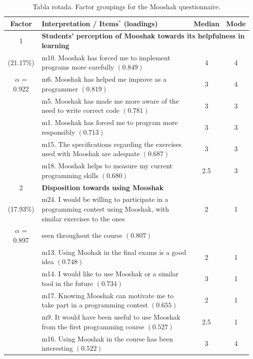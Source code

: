\documentclass[12pt,twoside,titlepage]{report}
\begin{document}
\begin{table}
  \centering
  \caption{Tabla rotada. Factor groupings for the Mooshak questionnaire.}\label{tab:factor_analysis}

\renewcommand{\arraystretch}{1.1}
\begin{scriptsize}
 \begin{tabular}{clcc}
   \hline
   Factor & \textbf{Interpretation} / Items$^{*}$ (loadings)  & Median & Mode \\
   \hline
   \hline
    1 & \multicolumn{3}{l}{\textbf{Students' perception of Mooshak towards its helpfulness in learning} } \\
   \hline
    (21.17\%) & m10. Mooshak has forced me to implement programs more carefully $(0.849)$ & 4 & 4 \\
    $\alpha$ = 0.922 & m6.  Mooshak has helped me improve as a programmer $(0.819)$ & 3 & 4 \\
     & m5.  Mooshak has made me more aware of the need to write correct code $(0.781)$ & 3 & 3\\
     & m1. Mooshak has forced me to program more responsibly $(0.713)$ & 3 & 3 \\
     & m15. The specifications regarding the exercises used with Mooshak are adequate $(0.687)$ & 3 & 3 \\
     & m18. Mooshak helps to measure my current programming skills $(0.680)$ & 2.5 & 3 \\
   \hline
    2 & \multicolumn{3}{l}{\textbf{Disposition towards using Mooshak} } \\
   \hline
    (17.93\%) & m24. I would be willing to participate in a programming contest using Mooshak, with similar exercises to the ones & 2 & 1 \\
    $\alpha$ = 0.897 & seen throughout the course $(0.807)$ & & \\
    & m13. Using Moohak in the final exams is a good idea $(0.748)$ & 2 & 1 \\
    & m14. I would like to use Mooshak or a similar tool in the future $(0.734)$ & 3 & 1 \\
    & m17. Knowing Mooshak can motivate me to take part in a programming contest $(0.655)$ & 2 & 1\\
    & m9. It would have been useful to use Mooshak from the first programming course $(0.527)$ & 2.5 & 1\\
     & m16. Using Mooshak in the course has been interesting $(0.522)$ & 3 & 4 \\

\end{tabular}
\end{scriptsize}
\end{table}
\end{document}
